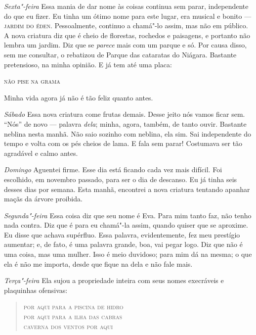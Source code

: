 \textit{Sexta"-feira} Essa mania de dar nome às coisas continua sem parar, independente do
que eu fizer. Eu tinha um ótimo nome para este lugar, era musical e bonito ---
\textsc{jardim do éden}. Pessoalmente, continuo a chamá"-lo assim, mas não em
público. A nova criatura diz que é cheio de florestas, rochedos e paisagens,
e portanto não lembra um jardim. Diz que se \textit{parece} mais com um parque e só.  
Por causa disso, sem me consultar, o rebatizou de Parque das cataratas do Niágara. 
Bastante pretensioso, na minha opinião. E já tem até uma placa: 

\begin{center}
\textsc{não pise na grama}
\end{center}


Minha vida agora já não é tão feliz quanto antes.

\textit{Sábado}  Essa nova criatura come frutas demais. Desse jeito nós vamos ficar sem.
“Nós” de novo --- palavra \textit{dela}; minha, agora, também, de tanto ouvir. Bastante
neblina nesta manhã. Não saio sozinho com neblina, ela sim. Sai
independente do tempo e volta com os pés cheios de lama. E fala sem parar!
Costumava ser tão agradável e calmo antes.

\textit{Domingo}  Aguentei firme. Esse dia está ficando cada vez mais difícil. Foi
escolhido, em novembro passado, para ser o dia de descanso. Eu já tinha seis
desses dias por semana. Esta manhã, encontrei a nova criatura tentando apanhar
maçãs da árvore proibida.

\textit{Segunda"-feira}   Essa coisa diz que seu nome é Eva. Para mim tanto faz, não tenho
nada contra. Diz que é para eu chamá"-la assim, quando quiser que se aproxime.
Eu disse que achava supérfluo. Essa palavra, evidentemente, fez meu prestígio
aumentar; e, de fato, é uma palavra grande, boa, vai pegar logo. Diz que não é
uma coisa, mas uma mulher. Isso é meio duvidoso; para mim dá na mesma;
o que ela é não me importa, desde que fique na dela e não fale mais. 

\textit{Terça"-feira}  Ela sujou a propriedade inteira com seus nomes execráveis e
plaquinhas ofensivas:  

\begin{verse}
\quad\textsc{por aqui para a piscina de hidro}\\
\quad\textsc{por aqui para a ilha das cabras}\\
\quad\textsc{caverna dos ventos por aqui}
\end{verse}

